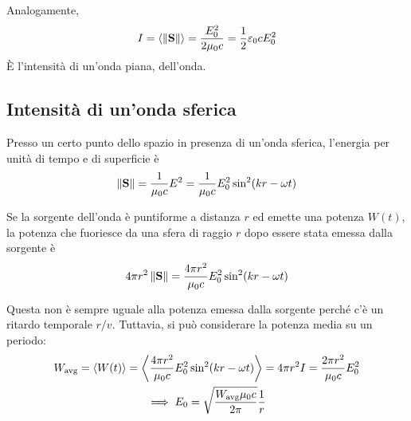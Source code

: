 Analogamente,
\begin{equation}
    I = \left\langle \left\lVert \mathbf{S} \right\rVert \right\rangle = \frac{E_0^2}{2 \mu_0 c}
    = \frac{1}{2} \varepsilon_0 c E_0^2
\end{equation}
È l'intensità di un'onda piana,  dell'onda.


\subsection{Intensità di un'onda sferica}
\label{sec:intensita_onda_sferica}

Presso un certo punto dello spazio in presenza di un'onda sferica, l'energia per unità di tempo e di superficie è
\begin{equation}
    \left\lVert \mathbf{S} \right\rVert = \frac{1}{\mu_0 c} E^2 = \frac{1}{\mu_0 c} E_0^2 \sin^2(kr - \omega t)
\end{equation}

Se la sorgente dell'onda è puntiforme a distanza $r$ ed emette una potenza $W(t)$, la potenza che fuoriesce da una sfera di raggio $r$ dopo essere stata emessa dalla sorgente è
\begin{equation}
    4 \pi r^2 \left\lVert \mathbf{S} \right\rVert = \frac{4 \pi r^2}{\mu_0 c} E_0^2 \sin^2(kr - \omega t)
\end{equation}

Questa non è sempre uguale alla potenza emessa dalla sorgente perché c'è un ritardo temporale $r/v$.
Tuttavia, si può considerare la potenza media su un periodo:
\begin{gather}
    W_\text{avg} = \left\langle W(t) \right\rangle = \left\langle \frac{4 \pi r^2}{\mu_0 c} E_0^2 \sin^2(kr - \omega t) \right\rangle
    = 4\pi r^2 I
    = \frac{2 \pi r^2}{\mu_0 c} E_0^2 \\
    \implies E_0 = \sqrt{\frac{W_\text{avg} \mu_0 c}{2\pi}} \frac{1}{r}
\end{gather}

